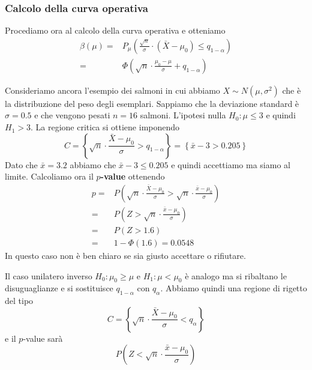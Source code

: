 \subsubsection{Calcolo della curva operativa}
Procediamo ora al calcolo della curva operativa e otteniamo
\begin{align*}
	\beta(\mu) = & P_\mu \left( \frac{\sqrt{n}}{\sigma} \cdot (\bar{X} - \mu_0) \leq
	q_{1-\alpha} \right)                                                                        \\
	=            & \Phi \left( \sqrt{n} \cdot \frac{\mu_0 - \mu}{\sigma} + q_{1-\alpha} \right)
\end{align*}

\begin{example}
	Consideriamo ancora l'esempio dei salmoni in cui abbiamo $X \sim N(\mu, \sigma^2)$ che è la
	distribuzione del peso degli esemplari. Sappiamo che la deviazione standard è $\sigma = 0.5$ e
	che vengono pesati $n = 16$ salmoni. L'ipotesi nulla $H_0 : \mu \leq 3$ e quindi $H_1 > 3$. La
	regione critica si ottiene imponendo
	\[
		C = \left\{ \sqrt{n} \cdot \frac{\bar{X} - \mu_0}{\sigma} > q_{1 - \alpha} \right\}
		= \left\{ \bar{x} - 3 > 0.205 \right\}
	\]
	Dato che $\bar{x} = 3.2$ abbiamo che $\bar{x} - 3 \leq 0.205$ e quindi accettiamo ma siamo al
	limite. Calcoliamo ora il \textbf{$p$-value} ottenendo
	\begin{align*}
		p = & P \left( \sqrt{n} \cdot \frac{\bar{X} - \mu_0}{\sigma} >
		\sqrt{n} \cdot \frac{\bar{x} - \mu_0}{\sigma} \right)                    \\
		=   & P \left( Z > \sqrt{n} \cdot \frac{\bar{x} - \mu_0}{\sigma} \right) \\
		=   & P (Z > 1.6)                                                        \\
		=   & 1 - \Phi(1.6) = 0.0548
	\end{align*}
	In questo caso non è ben chiaro se sia giusto accettare o rifiutare.
\end{example}

Il caso unilatero inverso $H_0 : \mu_0 \geq \mu$ e $H_1 : \mu < \mu_0$ è analogo ma si ribaltano
le disuguaglianze e si sostituisce $q_{1 - \alpha}$ con $q_\alpha$. Abbiamo quindi una regione di
rigetto del tipo
\[ C = \left\{ \sqrt{n} \cdot \frac{\bar{X} - \mu_0}{\sigma} < q_\alpha \right\} \]
e il $p$-value sarà
\[ P \left( Z < \sqrt{n} \cdot \frac{\bar{x} - \mu_0}{\sigma} \right) \]